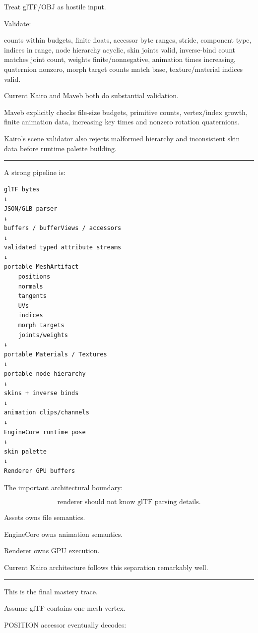 Treat glTF/OBJ as hostile input.

Validate:

counts within budgets, finite floats, accessor byte ranges, stride, component type, indices in range, node hierarchy acyclic, skin joints valid, inverse-bind count matches joint count, weights finite/nonnegative, animation times increasing, quaternion nonzero, morph target counts match base, texture/material indices valid.

Current Kairo and Maveb both do substantial validation.

Maveb explicitly checks file-size budgets, primitive counts, vertex/index growth, finite animation data, increasing key times and nonzero rotation quaternions.

Kairo's scene validator also rejects malformed hierarchy and inconsistent skin data before runtime palette building.

\begin{center}\rule{0.5\linewidth}{0.5pt}\end{center}

A strong pipeline is:

\begin{verbatim}
glTF bytes
↓
JSON/GLB parser
↓
buffers / bufferViews / accessors
↓
validated typed attribute streams
↓
portable MeshArtifact
    positions
    normals
    tangents
    UVs
    indices
    morph targets
    joints/weights
↓
portable Materials / Textures
↓
portable node hierarchy
↓
skins + inverse binds
↓
animation clips/channels
↓
EngineCore runtime pose
↓
skin palette
↓
Renderer GPU buffers
\end{verbatim}

The important architectural boundary:

\[
\boxed{
\text{renderer should not know glTF parsing details}.
}
\]

Assets owns file semantics.

EngineCore owns animation semantics.

Renderer owns GPU execution.

Current Kairo architecture follows this separation remarkably well.

\begin{center}\rule{0.5\linewidth}{0.5pt}\end{center}

This is the final mastery trace.

Assume glTF contains one mesh vertex.

POSITION accessor eventually decodes:

